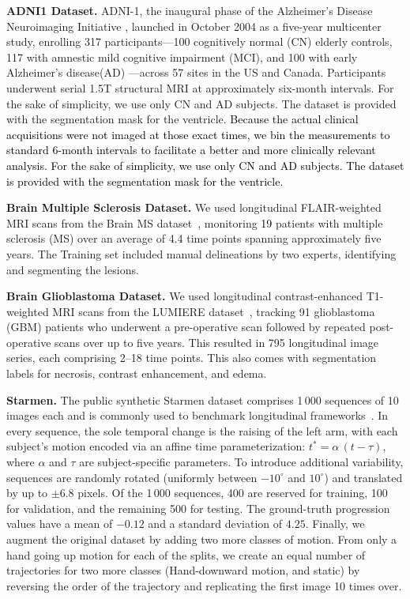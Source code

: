 \documentclass[twoside]{article}
\newcommand{\bc}[1]{\textcolor{black}{#1}}
\begin{document}
\textbf{ADNI1 Dataset.} ADNI-1, the inaugural phase of the Alzheimer’s Disease Neuroimaging Initiative \citep{Mueller2005}, launched in October 2004 as a five-year multicenter study, enrolling 317 participants—100 cognitively normal (CN) elderly controls, 117 with amnestic mild cognitive impairment (MCI), and 100 with early Alzheimer’s disease(AD) —across 57 sites in the US and Canada. Participants underwent serial 1.5T structural MRI at approximately six-month intervals. For the sake of simplicity, we use only CN and AD subjects. The dataset is provided with the segmentation mask for the ventricle. \textcolor{black}{  Because the actual clinical acquisitions were not imaged at those exact times, we bin the measurements to standard 6-month intervals to facilitate a better and more clinically relevant analysis. For the sake of simplicity, we use only CN and AD subjects. The dataset is provided with the segmentation mask for the ventricle.}


\textbf{Brain Multiple Sclerosis Dataset.} We used longitudinal FLAIR-weighted MRI scans from the Brain MS dataset~\citep{Carass2017}, monitoring \bc{19} patients with multiple sclerosis (MS) over an average of 4.4 time points spanning approximately five years. The Training set included manual delineations by two experts, identifying and segmenting the lesions.

\textbf{Brain Glioblastoma Dataset.} We used longitudinal contrast-enhanced T1-weighted MRI scans from the LUMIERE dataset~\citep{Suter2022}, tracking 91 glioblastoma (GBM) patients who underwent a pre-operative scan followed by repeated post-operative scans over up to five years. This resulted in 795 longitudinal image series, each comprising 2–18 time points. This also comes with segmentation labels for necrosis, contrast enhancement, and edema.



\textbf{Starmen.} The public synthetic Starmen dataset comprises 1\,000 sequences of 10 images each and is commonly used to benchmark longitudinal frameworks~\citep{Bone2018}. In every sequence, the sole temporal change is the raising of the left arm, with each subject’s motion encoded via an affine time parameterization: $t^* = \alpha\,(t - \tau)$, where \(\alpha\) and \(\tau\) are subject-specific parameters. To introduce additional variability, sequences are randomly rotated (uniformly between \(-10^\circ\) and \(10^\circ\)) and translated by up to \(\pm 6.8\) pixels. Of the 1\,000 sequences, 400 are reserved for training, 100 for validation, and the remaining 500 for testing. The ground-truth progression values have a mean of \(-0.12\) and a standard deviation of \(4.25\). Finally, we augment the original dataset by adding two more classes of motion. From only a hand going up motion for each of the splits, we create an equal number of trajectories for two more classes (Hand-downward motion, and static) by reversing the order of the trajectory and replicating the first image 10 times over.
\end{document}
